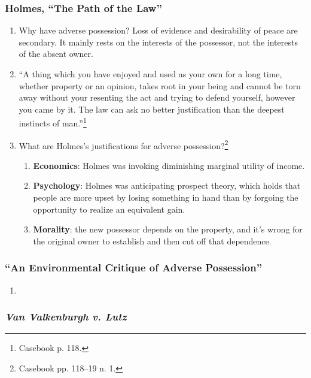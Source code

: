 \subsubsection{Holmes, ``The Path of the Law''}

\begin{enumerate}
    \item Why have adverse possession? Loss of evidence and desirability of 
    peace are secondary. It mainly rests on the interests of the possessor, 
    not the interests of the absent owner.
    \item ``A thing which you have enjoyed and used as your own for a long 
    time, whether property or an opinion, takes root in your being and cannot 
    be torn away without your resenting the act and trying to defend yourself, 
    however you came by it. The law can ask no better justification than the 
    deepest instincts of man.''\footnote{Casebook p. 118.}
    \item What are Holmes's justifications for adverse 
    possession?\footnote{Casebook pp. 118--19 n. 1.}
    \begin{enumerate}
        \item \textbf{Economics}: Holmes was invoking diminishing marginal 
        utility of income.
        \item \textbf{Psychology}: Holmes was anticipating prospect theory, 
        which holds that people are more upset by losing something in hand 
        than by forgoing the opportunity to realize an equivalent gain.
        \item \textbf{Morality}: the new possessor depends on the property, 
        and it's wrong for the original owner to establish and then cut off 
        that dependence.
    \end{enumerate}
\end{enumerate}

\subsubsection{``An Environmental Critique of Adverse Possession''}

\begin{enumerate}
    \item %
\end{enumerate}

\subsubsection{\emph{Van Valkenburgh v. Lutz}}

